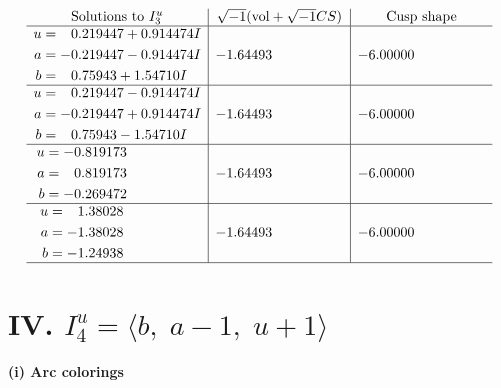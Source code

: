 \documentclass[1p]{elsarticle_modified}
\theoremstyle{definition}
\newcommand{\I}{\sqrt{-1}}
\begin{document}
$$\begin{array}{c|c|c}  
\text{Solutions to }I^u_{3}& \I (\text{vol} + \sqrt{-1}CS) & \text{Cusp shape}\\
 \hline 
\begin{aligned}
u &= \phantom{-}0.219447 + 0.914474 I \\
a &= -0.219447 - 0.914474 I \\
b &= \phantom{-}0.75943 + 1.54710 I\end{aligned}
 & -1.64493\phantom{ +0.000000I} & -6.00000\phantom{ +0.000000I} \\ \hline\begin{aligned}
u &= \phantom{-}0.219447 - 0.914474 I \\
a &= -0.219447 + 0.914474 I \\
b &= \phantom{-}0.75943 - 1.54710 I\end{aligned}
 & -1.64493\phantom{ +0.000000I} & -6.00000\phantom{ +0.000000I} \\ \hline\begin{aligned}
u &= -0.819173\phantom{ +0.000000I} \\
a &= \phantom{-}0.819173\phantom{ +0.000000I} \\
b &= -0.269472\phantom{ +0.000000I}\end{aligned}
 & -1.64493\phantom{ +0.000000I} & -6.00000\phantom{ +0.000000I} \\ \hline\begin{aligned}
u &= \phantom{-}1.38028\phantom{ +0.000000I} \\
a &= -1.38028\phantom{ +0.000000I} \\
b &= -1.24938\phantom{ +0.000000I}\end{aligned}
 & -1.64493\phantom{ +0.000000I} & -6.00000\phantom{ +0.000000I}\\
 \hline 
 \end{array}$$\newpage\newpage\renewcommand{\arraystretch}{1}
\centering \section*{IV. $I^u_{4}= \langle b,\;a-1,\;u+1 \rangle$}
\flushleft \textbf{(i) Arc colorings}\\
\end{document}
